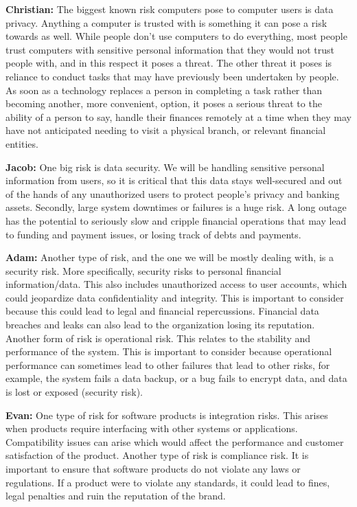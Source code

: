 \documentclass{article}
\begin{document}
\begin{enumerate}
    \textbf{Christian:} The biggest known risk computers pose to computer users is data privacy. Anything a computer is trusted with is something it can pose a risk towards as well. While people don't use computers to do everything, most people trust computers with sensitive personal information that they would not trust people with, and in this respect it poses a threat. The other threat it poses is reliance to conduct tasks that may have previously been undertaken by people. As soon as a technology replaces a person in completing a task rather than becoming another, more convenient, option, it poses a serious threat to the ability of a person to say, handle their finances remotely at a time when they may have not anticipated needing to visit a physical branch, or relevant financial entities.

    \textbf{Jacob:} One big risk is data security. We will be handling sensitive personal information from users, so it is critical that this data stays well-secured and out of the hands of any unauthorized users to protect people's privacy and banking assets. Secondly, large system downtimes or failures is a huge risk. A long outage has the potential to seriously slow and cripple financial operations that may lead to funding and payment issues, or losing track of debts and payments.

    \textbf{Adam:} Another type of risk, and the one we will be mostly dealing with, is a security risk. More specifically, security risks to personal financial information/data. This also includes unauthorized access to user accounts, which could jeopardize data confidentiality and integrity. This is important to consider because this could lead to legal and financial repercussions. Financial data breaches and leaks can also lead to the organization losing its reputation. Another form of risk is operational risk. This relates to the stability and performance of the system. This is important to consider because operational performance can sometimes lead to other failures that lead to other risks, for example, the system fails a data backup, or a bug fails to encrypt data, and data is lost or exposed (security risk).

    \textbf{Evan:} One type of risk for software products is integration risks. This arises when products require interfacing with other systems or applications. Compatibility issues can arise which would affect the performance and customer satisfaction of the product. Another type of risk is compliance risk. It is important to ensure that software products do not violate any laws or regulations. If a product were to violate any standards, it could lead to fines, legal penalties and ruin the reputation of the brand.
    

\end{enumerate}
\end{document}
